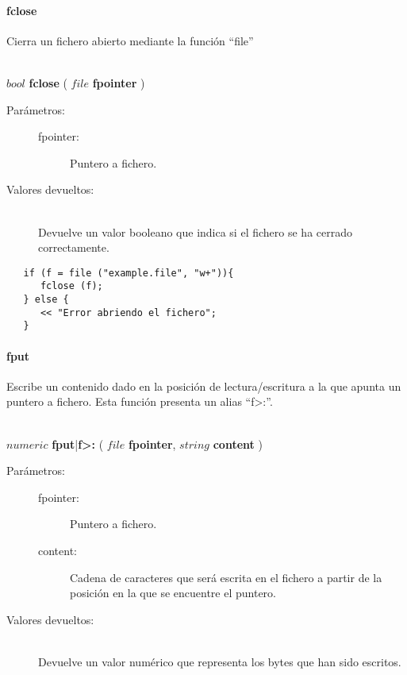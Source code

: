 \paragraph{fclose}
Cierra un fichero abierto mediante la función ``file''

\begin{framed}
\hfill \\ $bool$ \textbf{fclose} ( $file$ \textbf{fpointer}  )  
\begin{description}
\item [Parámetros:] \hfill 
   \begin{description}
   \item[fpointer:] Puntero a fichero. 
   \end{description}
\item[Valores devueltos:] \hfill \\
   Devuelve un valor booleano que indica si el fichero se ha cerrado correctamente.
\end{description}
\end{framed}

\begin{lstlisting}  
   if (f = file ("example.file", "w+")){
      fclose (f); 
   } else {
      << "Error abriendo el fichero";
   }
\end{lstlisting}

\paragraph{fput}
Escribe un contenido dado en la posición de lectura/escritura a la que apunta un puntero a fichero. Esta función presenta un alias ``f>:''.
\begin{framed}
\hfill \\ $numeric$ \textbf{fput}|\textbf{f>:} ( $file$ \textbf{fpointer}, $string$ \textbf{content}  )  
\begin{description}
\item [Parámetros:] \hfill 
   \begin{description}
   \item[fpointer:] Puntero a fichero. 
   \item[content:] Cadena de caracteres que será escrita en el fichero a partir de la posición en la que se encuentre el puntero. 
   \end{description}
\item[Valores devueltos:] \hfill \\
   Devuelve un valor numérico que representa los bytes que han sido escritos.
\end{description}
\end{framed}

